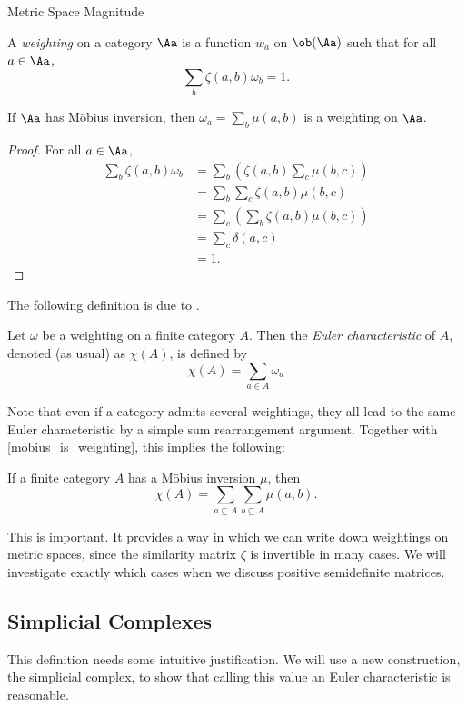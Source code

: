 \documentclass[12pt]{pom_thesis}
\begin{document}
\begin{chapter}{Metric Space Magnitude}
\begin{defn}
A \emph{weighting} on a category $\Aa$ is a function $w_a$ on $\ob(\Aa)$ such that for all $a \in \Aa$,
\[
\sum_b \zeta(a,b)\omega_b = 1.
\]
\end{defn}
\begin{lemma}
\label{mobius_is_weighting}
If $\Aa$ has M\"obius inversion, then $\omega_a = \sum_b \mu(a,b)$ is a weighting on $\Aa$.
\end{lemma}
\begin{proof} For all $a \in \Aa$,
\begin{align*}
\sum_b \zeta(a,b)\omega_b &= \sum_b\left( \zeta(a,b)\sum_c \mu(b,c)\right)\\
&=\sum_b\sum_c\zeta(a,b)\mu(b,c)\\
&=\sum_c\left(\sum_b\zeta(a,b)\mu(b,c)\right)\\
&=\sum_c \delta(a,c)\\
&=1.
\end{align*}
\end{proof}

The following definition is due to \cite{Lein1}.
\begin{defn}
Let $\omega$ be a weighting on a finite category $A$. Then the \emph{Euler characteristic} of $A$, denoted (as usual) as $\chi(A)$, is defined by
\[
\chi(A) = \sum_{a \in A} \omega_a
\]
\end{defn}
Note that even if a category admits several weightings, they all lead to the same Euler characteristic by a simple sum rearrangement argument. Together with \ref{mobius_is_weighting}, this implies the following:
\begin{cor}
If a finite category $A$ has a M\"obius inversion $\mu$, then
\[\chi(A) = \sum_{a \subseteq A} \sum_{b \subseteq A} \mu(a, b).
\]
\end{cor}
This is important. It provides a way in which we can write down weightings on metric spaces, since the similarity matrix $\zeta$ is invertible in many cases. We will investigate exactly which cases when we discuss positive semidefinite matrices.
\subsection{Simplicial Complexes}
This definition needs some intuitive justification. We will use a new construction, the simplicial complex, to show that calling this value an Euler characteristic is reasonable. 


\end{chapter}
\end{document}
